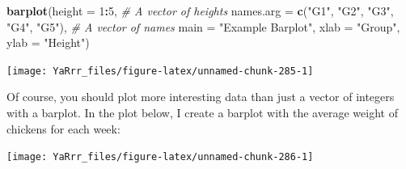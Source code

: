 \documentclass[]{book}
\newenvironment{Shaded}{\begin{snugshade}}{\end{snugshade}}
\newcommand{\KeywordTok}[1]{\textcolor[rgb]{0.13,0.29,0.53}{\textbf{#1}}}
\newcommand{\DataTypeTok}[1]{\textcolor[rgb]{0.13,0.29,0.53}{#1}}
\newcommand{\DecValTok}[1]{\textcolor[rgb]{0.00,0.00,0.81}{#1}}
\newcommand{\StringTok}[1]{\textcolor[rgb]{0.31,0.60,0.02}{#1}}
\newcommand{\CommentTok}[1]{\textcolor[rgb]{0.56,0.35,0.01}{\textit{#1}}}
\newcommand{\OperatorTok}[1]{\textcolor[rgb]{0.81,0.36,0.00}{\textbf{#1}}}
\newcommand{\NormalTok}[1]{#1}
\theoremstyle{definition}
\theoremstyle{definition}
\theoremstyle{remark}
\begin{document}
\begin{Shaded}
\begin{Highlighting}[]
\KeywordTok{barplot}\NormalTok{(}\DataTypeTok{height =} \DecValTok{1}\OperatorTok{:}\DecValTok{5}\NormalTok{,  }\CommentTok{# A vector of heights}
        \DataTypeTok{names.arg =} \KeywordTok{c}\NormalTok{(}\StringTok{"G1"}\NormalTok{, }\StringTok{"G2"}\NormalTok{, }\StringTok{"G3"}\NormalTok{, }\StringTok{"G4"}\NormalTok{, }\StringTok{"G5"}\NormalTok{), }\CommentTok{# A vector of names}
        \DataTypeTok{main =} \StringTok{"Example Barplot"}\NormalTok{, }
        \DataTypeTok{xlab =} \StringTok{"Group"}\NormalTok{, }
        \DataTypeTok{ylab =} \StringTok{"Height"}\NormalTok{)}
\end{Highlighting}
\end{Shaded}

\begin{center}\texttt{[image: YaRrr\_files/figure-latex/unnamed-chunk-285-1]} \end{center}

Of course, you should plot more interesting data than just a vector of
integers with a barplot. In the plot below, I create a barplot with the
average weight of chickens for each week:

\begin{Shaded}
\end{Shaded}

\begin{center}\texttt{[image: YaRrr\_files/figure-latex/unnamed-chunk-286-1]} \end{center}
\end{document}
